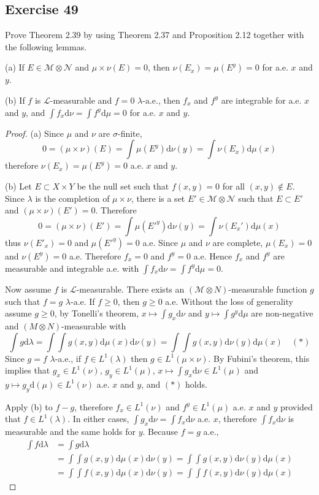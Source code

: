 \subsection*{Exercise 49}
Prove Theorem 2.39 by using Theorem 2.37 and Proposition 2.12 together with the following lemmas.
\par (a) If $E\in\mathcal{M}\otimes\mathcal{N}$ and $\mu\times\nu(E)=0$, then $\nu(E_x)=\mu(E^y)=0$ for a.e. $x$ and $y$.
\par (b) If $f$ is $\mathcal{L}$-measurable and $f=0$ $\lambda$-a.e., then $f_x$ and $f^y$ are integrable for a.e. $x$ and $y$, and $\int f_x\mathrm{d}\nu=\int f^y\mathrm{d}\mu=0$ for a.e. $x$ and $y$.
\begin{proof}
    \par (a) Since $\mu$ and $\nu$ are $\sigma$-finite,
    $$
    0=(\mu\times\nu)(E)=\int\mu(E^y)\mathrm{d}\nu(y)=\int\nu(E_x)\mathrm{d}\mu(x)
    $$
    therefore $\nu(E_x)=\mu(E^y)=0$ a.e. $x$ and $y$.
    \par (b) Let $E\subset X\times Y$ be the null set such that $f(x,y)=0$ for all $(x,y)\not\in E$. Since $\lambda$ is the completion of $\mu\times\nu$, there is a set $E'\in\mathcal{M}\otimes\mathcal{N}$ such that $E\subset E'$ and $(\mu\times\nu)(E')=0$. Therefore
    $$
    0=(\mu\times\nu)(E')=\int\mu(E'^y)\mathrm{d}\nu(y)=\int\nu(E_x')\mathrm{d}\mu(x)
    $$
    thus $\nu(E'_x)=0$ and $\mu(E'^y)=0$ a.e. Since $\mu$ and $\nu$ are complete, $\mu(E_x)=0$ and $\nu(E^y)=0$ a.e. Therefore $f_x=0$ and $f^y=0$ a.e. Hence $f_x$ and $f^y$ are measurable and integrable a.e. with $\int f_x\mathrm{d}\nu=\int f^y\mathrm{d}\mu=0$.
    \par Now assume $f$ is $\mathcal{L}$-measurable. There exists an $(\mathcal{M}\otimes N)$-measurable function $g$ such that $f=g$ $\lambda$-a.e. If $f\ge 0$, then $g\ge 0$ a.e. Without the loss of generality assume $g\ge 0$, by Tonelli's theorem, $x\mapsto\int g_x\mathrm{d}\nu$ and $y\mapsto\int g^y\mathrm{d}\mu$ are non-negative and $(M\otimes N)$-measurable with
    $$
    \int g\mathrm{d}\lambda=\int\int g(x,y)\mathrm{d}\mu(x)\mathrm{d}\nu(y)=\int\int g(x,y)\mathrm{d}\nu(y)\mathrm{d}\mu(x)\quad (*)
    $$
    Since $g=f$ $\lambda$-a.e., if $f\in L^1(\lambda)$ then $g\in L^1(\mu\times\nu)$. By Fubini's theorem, this implies that $g_x\in L^1(\nu)$, $g_y\in L^1(\mu)$, $x\mapsto\int g_x\mathrm{d}\nu\in L^1(\mu)$ and $y\mapsto g_y\mathrm{d}(\mu)\in L^1(\nu)$ a.e. $x$ and $y$,  and $(*)$ holds.
    \par Apply (b) to $f-g$, therefore $f_x\in L^1(\nu)$ and $f^y\in L^1(\mu)$ a.e. $x$ and $y$ provided that $f\in L^1(\lambda)$. In either cases, $\int g_x\mathrm{d}\nu=\int f_x\mathrm{d}\nu$ a.e. $x$, therefore $\int f_x\mathrm{d}\nu$ is measurable and the same holds for $y$. Because $f=g$ a.e.,
    \begin{align*}
        \int f\mathrm{d}\lambda&=\int g\mathrm{d}\lambda\\
        &=\int\int g(x,y)\mathrm{d}\mu(x)\mathrm{d}\nu(y)=\int\int g(x,y)\mathrm{d}\nu(y)\mathrm{d}\mu(x)\\
        &=\int\int f(x,y)\mathrm{d}\mu(x)\mathrm{d}\nu(y)=\int\int f(x,y)\mathrm{d}\nu(y)\mathrm{d}\mu(x)
    \end{align*}
\end{proof}

